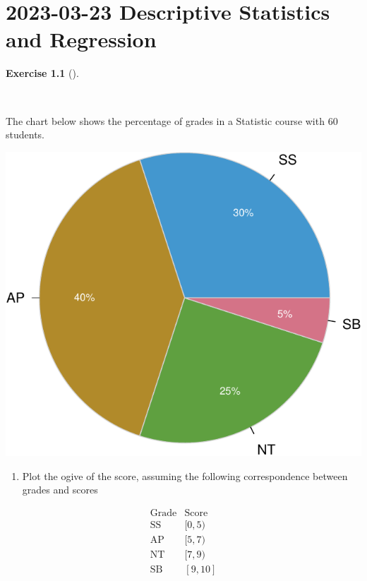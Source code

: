 \documentclass[
  a4paper,
]{scrreport}
\providecommand{\tightlist}{%
  \setlength{\itemsep}{0pt}\setlength{\parskip}{0pt}}\usepackage{longtable,booktabs,array}
\theoremstyle{definition}
\newtheorem{exercise}{Exercise}[chapter]
\theoremstyle{remark}
\begin{document}

\hypertarget{descriptive-statistics-and-regression-2}{%
\chapter{\texorpdfstring{2023-03-23 Descriptive Statistics and
Regression}{2023-03-23  Descriptive Statistics and Regression}}\label{descriptive-statistics-and-regression-2}}

\begin{exercise}[]\protect\hypertarget{exr-1}{}\label{exr-1}

~

The chart below shows the percentage of grades in a Statistic course
with 60 students.

\includegraphics{img/exam-2023-03-23/pie-chart-scores-1.pdf}

\begin{enumerate}
\def\labelenumi{\alph{enumi}.}
\tightlist
\item
  Plot the ogive of the score, assuming the following correspondence
  between grades and scores
\end{enumerate}

\[
\begin{array}{lc}
  \mbox{Grade} & \mbox{Score}\\
  \mbox{SS} & [0, 5)\\
  \mbox{AP} & [5, 7)\\
  \mbox{NT} & [7,9)\\
  \mbox{SB} & [9,10]
\end{array}
\]


\end{exercise}
\end{document}
